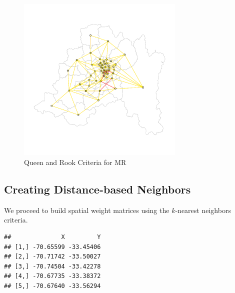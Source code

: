 \begin{figure}[ht]
  \caption{Queen and Rook Criteria for MR}
    \label{fig:Queen-Rook}
\begin{knitrout}
\color{fgcolor}

{\centering \includegraphics[width=8cm,height=8cm]{figure/plot-queen-rookT-1} 

}


\end{knitrout}
\end{figure}

\subsection{Creating Distance-based Neighbors}

We proceed to build spatial weight matrices using the $k$-nearest neighbors criteria. 

\begin{knitrout}
\color{fgcolor}\begin{kframe}
\begin{alltt}
 \hldef{)}                                       
\end{alltt}
\begin{verbatim}
##              X         Y
## [1,] -70.65599 -33.45406
## [2,] -70.71742 -33.50027
## [3,] -70.74504 -33.42278
## [4,] -70.67735 -33.38372
## [5,] -70.67640 -33.56294
\end{verbatim}
\begin{alltt}
 \hlkwb{<-}   \hldef{=} \hldef{,}  \hldef{=} \hldef{)}  
 \hlkwb{<-}   \hldef{=} \hldef{,}  \hldef{=} \hldef{)}  
\end{alltt}
\end{kframe}
\end{knitrout}

